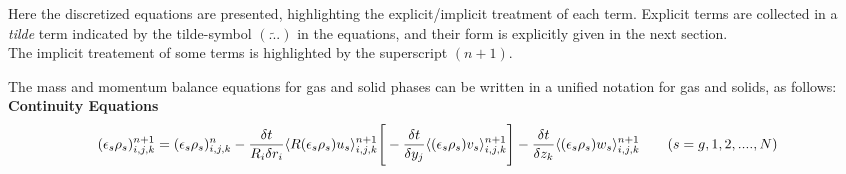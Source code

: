 Here the discretized equations are presented, highlighting the 
explicit/implicit treatment of each term.
Explicit terms are collected in a {\em tilde} term indicated by the 
tilde-symbol $(\widetilde{...})$ in the equations, and their form is 
explicitly given in the next section.\\
The implicit treatement of some terms is highlighted by the superscript $(n+1)$.

The mass and momentum balance equations for gas and solid phases can be written in a 
unified notation for gas and solids, as follows:\\

%
{\bf Continuity Equations}\\
%
\begin{eqnarray}
\htmlimage{}
(\epsilon_s \rho_s)_{i,j,k}^{n+1} = (\epsilon_s \rho_s)_{i,j,k}^{n} -
\frac{\delta t}{R_i \delta r_i} \langle R(\epsilon_s \rho_s) u_s \rangle_{i,j,k}^{n+1}
\Bigg[- \frac{\delta t}{\delta y_j} \langle (\epsilon_s \rho_s) v_s \rangle_{i,j,k}^{n+1}\Bigg]
- \frac{\delta t}{\delta z_k} \langle (\epsilon_s \rho_s) w_s \rangle_{i,j,k}^{n+1}
\qquad (s=g,1,2, ....,N)
\nonumber
\end{eqnarray}\\

